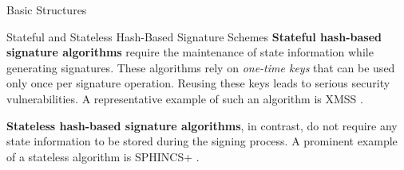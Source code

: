 \documentclass [version=submission]{iacrcc}
\begin{document}
\begin{section}{Basic Structures}{\label{sec1}}
\begin{subsection}{Stateful and Stateless Hash-Based Signature Schemes}
\textbf{Stateful hash-based signature algorithms} require the maintenance of state information while generating signatures. These algorithms rely on \textit{one-time keys} that can be used only once per signature operation. Reusing these keys leads to serious security vulnerabilities. A representative example of such an algorithm is XMSS \cite{huelsing2018rfc}.

\textbf{Stateless hash-based signature algorithms}, in contrast, do not require any state information to be stored during the signing process. A prominent example of a stateless algorithm is SPHINCS+ \cite{bernstein2019sphincs+}.
    
\end{subsection}

\end{section}
\end{document}
